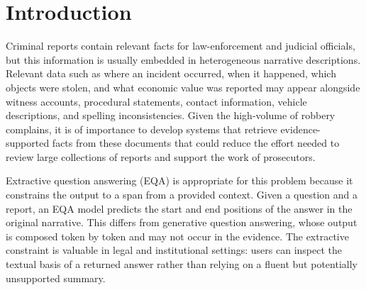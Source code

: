 \documentclass[graybox]{SNmult}
\begin{document}



\section{Introduction}
\label{sec:introduction}


Criminal reports contain relevant facts for law-enforcement and
judicial officials, but this information is usually embedded in
heterogeneous narrative descriptions. Relevant data such as where an
incident occurred, when it happened, which objects were stolen, and
what economic value was reported may appear alongside witness
accounts, procedural statements, contact information, vehicle
descriptions, and spelling inconsistencies. Given the high-volume
of robbery complains, it is of importance to develop systems that retrieve
evidence-supported facts from these documents that could reduce the effort
needed to review large collections of reports and support the work of
prosecutors.

Extractive question answering (EQA) is appropriate for this problem
because it constrains the output to a span from a provided
context. Given a question and a report, an EQA model predicts the
start and end positions of the answer in the original narrative. This
differs from generative question answering, whose output is composed
token by token and may not occur in the evidence. The extractive
constraint is valuable in legal and institutional settings: users can
inspect the textual basis of a returned answer rather than relying on
a fluent but potentially unsupported summary.
\end{document}
